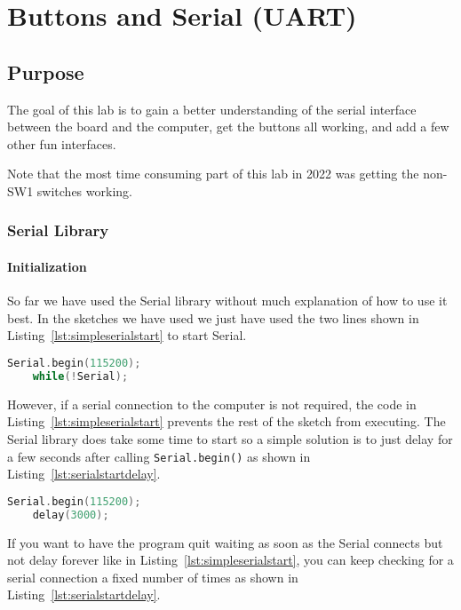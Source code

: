 \chapter{Buttons and Serial (UART)}

\section{Purpose}
The goal of this lab is to gain a better understanding of the serial interface between
the board and the computer, get the buttons all working, and add a few other fun interfaces. 

Note that the most time consuming part of this lab in 2022 was getting the non-SW1 switches
working.

\subsection{Serial Library}
\subsubsection{Initialization}
So far we have used the Serial library without much explanation of how to use it best.
In the sketches we have used we just have used the two lines shown in 
Listing~\ref{lst:simpleserialstart} to start Serial.

\begin{lstlisting}[language=C++, caption={If serial is required for a sketch this method of 
    starting Serial blocks until a serial monitor is started.},label={lst:simpleserialstart}]
    Serial.begin(115200);
    while(!Serial);
\end{lstlisting}

However, if a serial connection to the computer is not required, the code in 
Listing~\ref{lst:simpleserialstart} prevents the rest of the sketch from executing. The Serial
library does take some time to start so a simple solution is to just delay for a few seconds
after calling \lstinline$Serial.begin()$ as shown in Listing~\ref{lst:serialstartdelay}.

\begin{lstlisting}[language=C++, caption={If serial is not required for a sketch this method of 
    starting Serial waits a bit in hopes it connects.},label={lst:serialstartdelay}]
    Serial.begin(115200);
    delay(3000);
\end{lstlisting}

If you want to have the program quit waiting as soon as the Serial connects but not delay forever
like in Listing~\ref{lst:simpleserialstart}, you can keep checking for a serial connection a fixed
number of times as shown in Listing~\ref{lst:serialstartdelay}.

